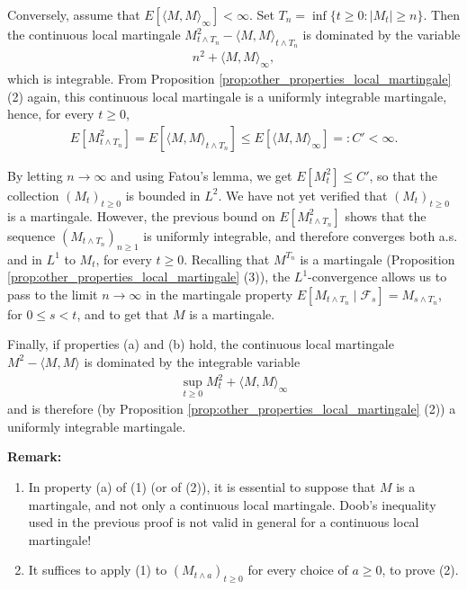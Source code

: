 \documentclass[../Main.tex]{subfiles}
\begin{document}
{Conversely, assume that $E[\langle M, M \rangle_\infty] < \infty$. Set $T_n = \inf\{t \geq 0 : |M_t| \geq n\}$. Then the continuous local martingale $M_{t \wedge T_n}^2 - \langle M, M \rangle_{t \wedge T_n}$ is dominated by the variable
\begin{align*}
n^2 + \langle M, M \rangle_\infty,
\end{align*}
which is integrable. From Proposition \ref{prop:other_properties_local_martingale} (2) again, this continuous local martingale is a uniformly integrable martingale, hence, for every $t \geq 0$,
\begin{align*}
E[M_{t \wedge T_n}^2] = E[\langle M, M \rangle_{t \wedge T_n}] \leq E[\langle M, M \rangle_\infty] =: C' < \infty.
\end{align*}

By letting $n \to \infty$ and using Fatou's lemma, we get $E[M_t^2] \leq C'$, so that the collection $(M_t)_{t \geq 0}$ is bounded in $L^2$. We have not yet verified that $(M_t)_{t \geq 0}$ is a martingale. However, the previous bound on $E[M_{t \wedge T_n}^2]$ shows that the sequence $(M_{t \wedge T_n})_{n \geq 1}$ is uniformly integrable, and therefore converges both a.s. and in $L^1$ to $M_t$, for every $t \geq 0$. Recalling that $M^{T_n}$ is a martingale (Proposition \ref{prop:other_properties_local_martingale} (3)), the $L^1$-convergence allows us to pass to the limit $n \to \infty$ in the martingale property $E[M_{t \wedge T_n} \mid \mathcal{F}_s] = M_{s \wedge T_n}$, for $0 \leq s < t$, and to get that $M$ is a martingale.

Finally, if properties (a) and (b) hold, the continuous local martingale $M^2 - \langle M, M \rangle$ is dominated by the integrable variable
\begin{align*}
\sup_{t \geq 0} M_t^2 + \langle M, M \rangle_\infty
\end{align*}
and is therefore (by Proposition \ref{prop:other_properties_local_martingale} (2)) a uniformly integrable martingale.
}
\textbf{Remark:}
\begin{enumerate}
    \item In property (a) of (1) (or of (2)), it is essential to suppose that $M$ is a martingale, and not only a continuous local martingale. Doob's inequality used in the previous proof is not valid in general for a continuous local martingale!
    \item It suffices to apply (1) to $(M_{t \wedge a})_{t \geq 0}$ for every choice of $a \geq 0$, to prove (2). 
\end{enumerate}
    
\end{document}
